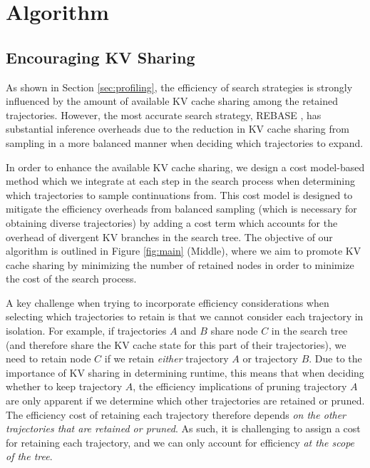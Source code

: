 
\section{Algorithm}

\subsection{Encouraging KV Sharing}
\label{sec:algo-kv}

As shown in Section \ref{sec:profiling}, the efficiency of search strategies is strongly influenced by the amount of available KV cache sharing among the retained trajectories. 
However, the most accurate search strategy, REBASE \cite{wu2024inference}, has substantial inference overheads due to the reduction in KV cache sharing from sampling in a more balanced manner when deciding which trajectories to expand.

In order to enhance the available KV cache sharing, we design a cost model-based method which we integrate at each step in the search process when determining which trajectories to sample continuations from.
This cost model is designed to mitigate the efficiency overheads from balanced sampling (which is necessary for obtaining diverse trajectories) by adding a cost term which accounts for the overhead of divergent KV branches in the search tree. 
The objective of our algorithm is outlined in Figure \ref{fig:main} (Middle), where we aim to promote KV cache sharing by minimizing the number of retained nodes in order to minimize the cost of the search process.

A key challenge when trying to incorporate efficiency considerations when selecting which trajectories to retain is that we cannot consider each trajectory in isolation. 
For example, if trajectories $A$ and $B$ share node $C$ in the search tree (and therefore share the KV cache state for this part of their trajectories), we need to retain node $C$ if we retain \textit{either} trajectory $A$ or trajectory $B$.
Due to the importance of KV sharing in determining runtime, this means that when deciding whether to keep trajectory $A$, the efficiency implications of pruning trajectory $A$ are only apparent if we determine which other trajectories are retained or pruned. 
The efficiency cost of retaining each trajectory therefore depends \textit{on the other trajectories that are retained or pruned}.
As such, it is challenging to assign a cost for retaining each trajectory, and we can only account for efficiency \textit{at the scope of the tree}.


